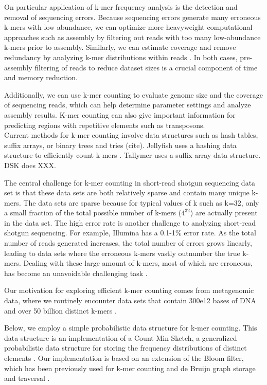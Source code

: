 \documentclass{article}
\begin{document}
On particular application of k-mer frequency analysis is the detection
and removal of sequencing errors.  Because sequencing errors generate
many erroneous k-mers with low abundance, we can optimize more
heavyweight computational approaches such as assembly by filtering out
reads with too many low-abundance k-mers prior to assembly. Similarly,
we can estimate coverage and remove redundancy by analyzing k-mer
distributions within reads \cite{diginorm}.  In both cases,
pre-assembly filtering of reads to reduce dataset sizes is a crucial
component of time and memory reduction.

Additionally, we can use k-mer counting to evaluate genome size and
the coverage of sequencing reads, which can help determine parameter
settings and analyze assembly results. K-mer counting can also give
important information for predicting regions with repetitive elements
such as transposons.\cite{Kurtz2008}\\

Current methods for k-mer counting involve data structures such as
hash tables, suffix arrays, or binary trees and tries (cite).
Jellyfish uses a hashing data structure to efficiently count k-mers
\cite{Marcais2011}. Tallymer uses a suffix array data
structure\cite{Kurtz2008}. DSK does XXX.


The central challenge for k-mer counting in short-read shotgun
sequencing data set is that these data sets are both relatively sparse
and contain many unique k-mers.  The data sets are sparse because for
typical values of k such as k=32, only a small fraction of the total
possible number of k-mers ($4^{32}$) are actually present in the data
set.  The high error rate is another challenge to analyzing short-read
shotgun sequencing. For example, Illumina has a 0.1-1\% error rate. As
the total number of reads generated increases, the total number of
errors grows linearly, leading to data sets where the erroneous k-mers
vastly outnumber the true k-mers.  Dealing with these large amount of
k-mers, most of which are erroneous, has become an unavoidable challenging
task \cite{Minoche2011}.

Our motivation for exploring efficient k-mer counting comes from
metagenomic data, where we routinely encounter data sets that contain
300e12 bases of DNA and over 50 billion distinct k-mers
\cite{adina_assembly}.

Below, we employ a simple probabilistic data structure for k-mer
counting.  This data structure is an implementation of a Count-Min
Sketch, a generalized probabilistic data structure for storing the
frequency distributions of distinct elements \cite{Cormode2005}.  Our
implementation is based on an extension of the Bloom filter, which has
been previously used for k-mer counting and de Bruijn graph storage
and traversal \cite{DBLP:journals/cacm/Bloom70,
  DBLP:journals/im/BroderM03,Melsted2011}.
  
\end{document}
